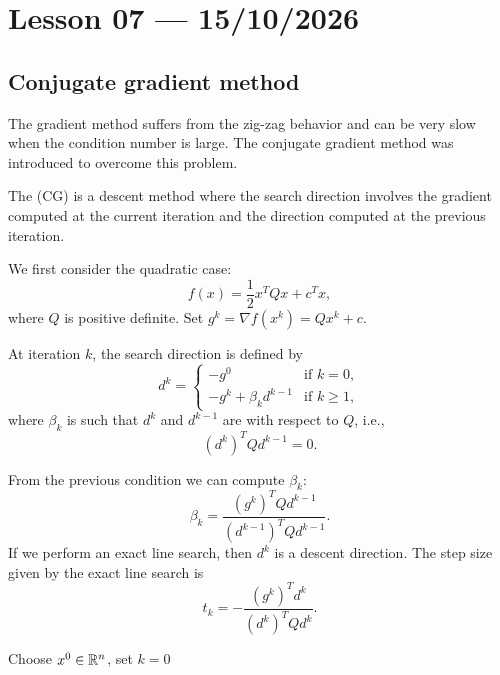 \section{Lesson 07 --- 15/10/2026}

\subsection{Conjugate gradient method}
The gradient method suffers from the zig-zag behavior and can be very slow when the condition number is large. The conjugate gradient method was introduced to overcome this problem.

The  (CG) is a descent method where the search direction involves the gradient computed at the current iteration and the direction computed at the previous iteration.

We first consider the quadratic case:
\[
    f(x) = \frac{1}{2}x^TQx + c^Tx,
\]
where $Q$ is positive definite. Set $g^k = \nabla f(x^k) = Qx^k + c$.

At iteration $k$, the search direction is defined by
\[
    d^k =
    \begin{cases}
        -g^0 & \text{if } k = 0,\\
        -g^k + \beta_k d^{k-1} & \text{if } k \ge 1,
    \end{cases}
\]
where $\beta_k$ is such that $d^k$ and $d^{k-1}$ are  with respect to $Q$, i.e.,
\[
    (d^k)^TQd^{k-1} = 0.
\]

From the previous condition we can compute $\beta_k$:
\[
    \beta_k = \frac{(g^k)^TQd^{k-1}}{(d^{k-1})^TQd^{k-1}}.
\]
If we perform an exact line search, then $d^k$ is a descent direction. The step size given by the exact line search is
\[
    t_k = -\frac{(g^k)^Td^k}{(d^k)^TQd^k}.
\]

\begin{algorithm}[H]
\caption{Conjugate gradient method for quadratic functions}
Choose $x^0 \in \mathbb{R}^n$, set $k = 0$\;
\end{algorithm}

